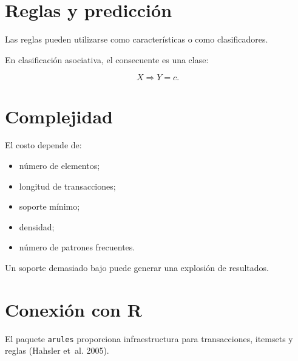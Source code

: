 \documentclass[
  spanish,
  10.5pt,
  letterpaper,
  DIV=11,
  numbers=noendperiod,
  oneside,
  open=any]{scrreprt}
\providecommand{\tightlist}{%
  \setlength{\itemsep}{0pt}\setlength{\parskip}{0pt}}
\theoremstyle{definition}
\theoremstyle{definition}
\theoremstyle{plain}
\theoremstyle{remark}
\begin{document}
\section*{Reglas y predicción}\label{reglas-y-predicciuxf3n}


Las reglas pueden utilizarse como características o como clasificadores.

En clasificación asociativa, el consecuente es una clase:

\[
X\Rightarrow Y=c.
\]

\section*{Complejidad}\label{complejidad}


El costo depende de:

\begin{itemize}
\tightlist
\item
  número de elementos;
\item
  longitud de transacciones;
\item
  soporte mínimo;
\item
  densidad;
\item
  número de patrones frecuentes.
\end{itemize}

Un soporte demasiado bajo puede generar una explosión de resultados.

\section*{Conexión con R}\label{conexiuxf3n-con-r-18}


El paquete \texttt{arules} proporciona infraestructura para
transacciones, itemsets y reglas (Hahsler et~al. 2005).
\end{document}
